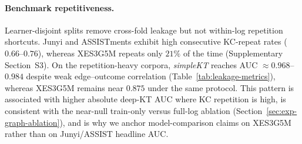\documentclass[pdflatex,sn-mathphys-num]{sn-jnl}
\begin{document}
\paragraph{Benchmark repetitiveness.}
\label{sec:exp-autocorr}
Learner-disjoint splits remove cross-fold leakage but not within-log
repetition shortcuts. Junyi and ASSISTments exhibit high consecutive
KC-repeat rates ($0.66$--$0.76$), whereas XES3G5M repeats only $21\%$ of the
time (Supplementary Section~S3). On the repetition-heavy corpora,
\textit{simpleKT} reaches AUC ${\approx}0.968$--$0.984$ despite weak
edge--outcome correlation (Table~\ref{tab:leakage-metrics}), whereas XES3G5M
remains near $0.875$ under the same protocol. This pattern is associated with
higher absolute deep-KT AUC where KC repetition is high, is consistent with
the near-null train-only versus full-log ablation
(Section~\ref{sec:exp-graph-ablation}), and is why we anchor model-comparison
claims on XES3G5M rather than on Junyi/ASSIST headline AUC.
\end{document}
